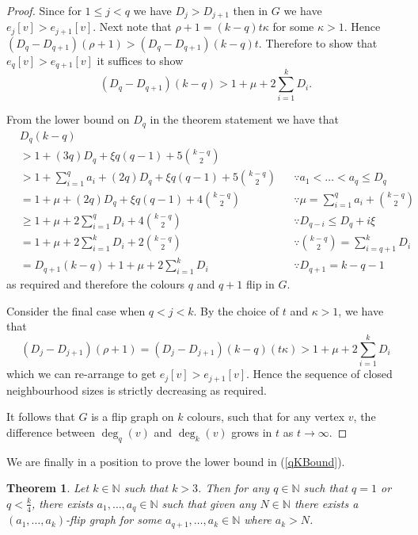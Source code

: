 \documentclass[a4paper,12pt]{article}
\newtheorem{theorem}{Theorem}[section]
\begin{document}
\begin{proof}
Since for $1 \leq j < q$ we have $D_j > D_{j+1}$ then in $G$ we have $e_j [v] > e_{j+1} [v]$. Next note that $\rho + 1 = (k-q)t\kappa$ for some $\kappa > 1$. Hence $(D_q - D_{q + 1})(\rho + 1) > (D_q - D_{q+1})(k-q)t$. Therefore to show that $e_q [v] > e_{q+1} [v]$ it suffices to show $$(D_q - D_{q+1})(k-q) > 1 + \mu + 2\sum\limits_{i=1}^k D_i.$$ 

From the lower bound on $D_q$ in the theorem statement we have that
\begin{align*}
	&D_q (k - q) &&\\
	&> 1 + (3q)D_q + \xi q(q-1) +  5\binom{k-q}{2} &&\\
	&> 1 + \sum\limits_{i = 1}^q a_i + (2q)D_q + \xi q(q-1) +  5\binom{k-q}{2} && \because a_1 < \dots < a_q \leq D_q\\
	&= 1 + \mu + (2q)D_q + \xi q(q-1) +  4\binom{k-q}{2} && \because \mu = \sum\limits_{i = 1}^q a_i + \binom{k-q}{2}\\
	&\geq 1 + \mu + 2\sum_{i=1}^q D_i + 4\binom{k-q}{2} && \because D_{q-i} \leq D_q + i\xi\\
	&= 1 + \mu + 2\sum_{i=1}^k D_i + 2\binom{k-q}{2} && \because \binom{k-q}{2} = \sum\limits_{i = q + 1}^{k} D_i\\
	&= D_{q+1} (k - q) + 1 + \mu + 2\sum_{i=1}^k D_i && \because D_{q+1} = k - q - 1
\end{align*}
as required and therefore the colours $q$ and $q+1$ flip in $G$.

Consider the final case when $q < j < k$. By the choice of $t$ and $\kappa > 1$, we have that $$(D_j - D_{j + 1})(\rho + 1) = (D_j - D_{j+1})(k-q)(t\kappa) > 1 + \mu + 2\sum\limits_{i = 1}^k D_i$$ which we can re-arrange to get $e_j [v] > e_{j+1} [v]$. Hence the sequence of closed neighbourhood sizes is strictly decreasing as required.

It follows that $G$ is a flip graph on $k$ colours, such that for any vertex $v$,  the difference between $\deg_q (v)$ and $\deg_k (v)$ grows in $t$ as $t \to \infty$.
\end{proof}

We are finally in a position to prove the lower bound in (\ref{qKBound}).

\begin{theorem}\label{qKLowerBound}
	Let $k \in \mathbb{N}$ such that $k > 3$. Then for any $q \in \mathbb{N}$ such that $q = 1$ or $q < \frac{k}{4}$, there exists $a_1, \dots, a_q \in \mathbb{N}$ such that given any $N \in \mathbb{N}$ there exists a $(a_1, \dots, a_k)$-flip graph for some $a_{q+1}, \dots, a_k \in \mathbb{N}$ where $a_k > N$.
\end{theorem}
\end{document}
